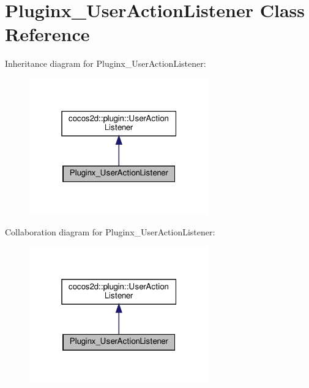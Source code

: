 \hypertarget{classPluginx__UserActionListener}{}\section{Pluginx\+\_\+\+User\+Action\+Listener Class Reference}
\label{classPluginx__UserActionListener}


Inheritance diagram for Pluginx\+\_\+\+User\+Action\+Listener\+:
\nopagebreak
\begin{figure}[H]
\begin{center}
\leavevmode
\includegraphics[width=220pt]{classPluginx__UserActionListener__inherit__graph}
\end{center}
\end{figure}


Collaboration diagram for Pluginx\+\_\+\+User\+Action\+Listener\+:
\nopagebreak
\begin{figure}[H]
\begin{center}
\leavevmode
\includegraphics[width=220pt]{classPluginx__UserActionListener__coll__graph}
\end{center}
\end{figure}

